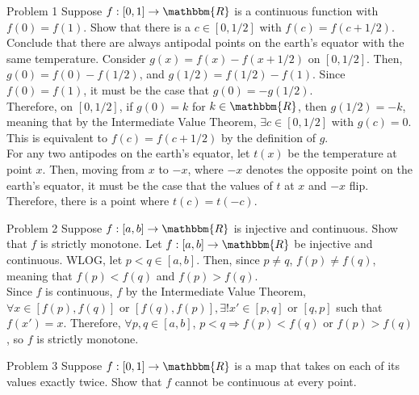 \documentclass[8pt]{extarticle}
\title{}
\author{}
\date{}
\newcommand{\R}{\mathbbm{R}}
\begin{document}
  \begin{problem}{Problem 1}
    Suppose $f:[0,1]\rightarrow \R$ is a continuous function with $f(0) = f(1)$. Show that there is a $c\in [0,1/2]$ with $f(c) = f(c + 1/2)$. Conclude that there are always antipodal points on the earth's equator with the same temperature.
    \tcblower
    Consider $g(x) = f(x) - f(x+1/2)$ on $[0,1/2]$. Then, $g(0) = f(0) - f(1/2)$, and $g(1/2) = f(1/2) - f(1)$. Since $f(0) = f(1)$, it must be the case that $g(0) = -g(1/2)$.\\

    Therefore, on $[0,1/2]$, if $g(0) = k$ for $k\in\R$, then $g(1/2) = -k$, meaning that by the Intermediate Value Theorem, $\exists c\in [0,1/2]$ with $g(c)=  0$. This is equivalent to $f(c) = f(c+1/2)$ by the definition of $g$.\\

    For any two antipodes on the earth's equator, let $t(x)$ be the temperature at point $x$. Then, moving from $x$ to $-x$, where $-x$ denotes the opposite point on the earth's equator, it must be the case that the values of $t$ at $x$ and $-x$ flip. Therefore, there is a point where $t(c) = t(-c)$.
  \end{problem}
  \begin{problem}{Problem 2}
    Suppose $f: [a,b] \rightarrow \R$ is injective and continuous. Show that $f$ is strictly monotone.
    \tcblower
    Let $f: [a,b] \rightarrow \R$ be injective and continuous. WLOG, let $p < q \in [a,b]$. Then, since $p\neq q$, $f(p) \neq f(q)$, meaning that $f(p) < f(q)$ and $f(p) > f(q)$.\\

    Since $f$ is continuous, $f$ by the Intermediate Value Theorem, $\forall x\in [f(p),f(q)]$ or  $[f(q),f(p)], \exists!x'\in [p,q]$ or $[q,p]$ such that $f(x') = x$. Therefore, $\forall p,q\in [a,b]$, $p < q \Rightarrow f(p) < f(q)$ or $f(p) > f(q)$, so $f$ is strictly monotone.
  \end{problem}
  \begin{problem}{Problem 3}
    Suppose $f: [0,1]\rightarrow \R$ is a map that takes on each of its values exactly twice. Show that $f$ cannot be continuous at every point.
  \end{problem}
\end{document}
